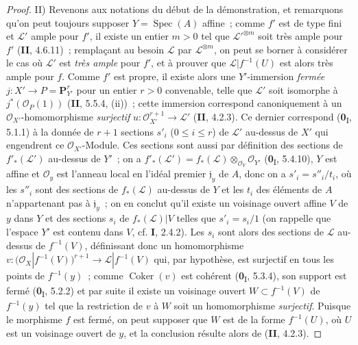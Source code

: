 \begin{proof}
\noindent II) Revenons aux notations du début de la démonstration,
et remarquons qu'on
peut toujours supposer $Y=\operatorname{Spec}(A)$
affine~; comme $f'$ est de type fini et $\mathcal L'$ ample pour $f'$, il
existe un entier $m>0$ tel que $\mathcal L'^{\otimes m}$ soit très ample pour
$f'$ (\textbf{II}, 4.6.11)~; remplaçant au besoin $\mathcal L$ par
$\mathcal L^{\otimes m}$, on peut se borner à considérer le cas où
$\mathcal L'$ est \emph{très ample} pour $f'$, et à prouver que
$\mathcal L|f^{-1}(U)$ est alors très ample pour $f$. Comme $f'$ est propre,
il existe alors une $Y'$-immersion \emph{fermée}
$j:X'\to P=\mathbf P_{Y'}^r$ pour un entier $r>0$ convenable, telle que
$\mathcal L'$ soit isomorphe à $j^*(\mathcal O_P(1))$ (\textbf{II}, 5.5.4, (ii))~;
cette immersion correspond canoniquement à un $\mathcal O_{X'}$-homomorphisme
\emph{surjectif}
$u:\mathcal O_{X'}^{r+1}\longrightarrow\mathcal L'$
(\textbf{II}, 4.2.3). Ce dernier correspond (\textbf{0}\textsubscript{I}, 5.1.1) à la donnée
de $r+1$ sections $s'_i$ ($0\leq i\leq r$) de $\mathcal L'$ au-dessus de
$X'$ qui engendrent ce $\mathcal O_{X'}$-Module. Ces sections sont aussi par
définition des sections de $f'_*(\mathcal L')$ au-dessus de $Y'$~; on a
$f'_*(\mathcal L')=f_*(\mathcal L)\otimes_{\mathcal O_Y}\mathcal O_{Y'}$
(\textbf{0}\textsubscript{I}, 5.4.10), $Y$ est affine et $\mathcal O_y$ est l'anneau
local en l'idéal premier $\mathfrak j_y$ de $A$, donc on a
$s'_i=s''_i/t_i$, où les $s''_i$ sont des sections de $f_*(\mathcal L)$
au-dessus de $Y$ et les $t_i$ des éléments de $A$ n'appartenant pas à
$\mathfrak j_y$~; on en conclut qu'il existe un voisinage ouvert affine $V$
de $y$ dans $Y$ et des sections $s_i$ de $f_*(\mathcal L)|V$ telles que
$s'_i=s_i/1$ (on rappelle que l'espace $Y'$ est contenu dans $V$, cf. \textbf{I},
2.4.2). Les $s_i$ sont alors des sections de $\mathcal L$ au-dessus de
$f^{-1}(V)$, définissant donc un homomorphisme
$v:\bigl(\mathcal O_X|f^{-1}(V)\bigr)^{r+1}
\longrightarrow\mathcal L|f^{-1}(V)$
qui, par hypothèse, est surjectif en tous les points de $f^{-1}(y)$~; comme
$\operatorname{Coker}(v)$ est cohérent (\textbf{0}\textsubscript{I}, 5.3.4), son
support est fermé (\textbf{0}\textsubscript{I}, 5.2.2) et par suite il existe un
voisinage ouvert $W\subset f^{-1}(V)$ de $f^{-1}(y)$ tel que la restriction
de $v$ à $W$ soit un homomorphisme \emph{surjectif}. Puisque le morphisme $f$ est
fermé, on peut supposer que $W$ est de la forme $f^{-1}(U)$, où $U$ est un
voisinage ouvert de $y$, et la conclusion résulte alors de (\textbf{II}, 4.2.3).
\end{proof}

